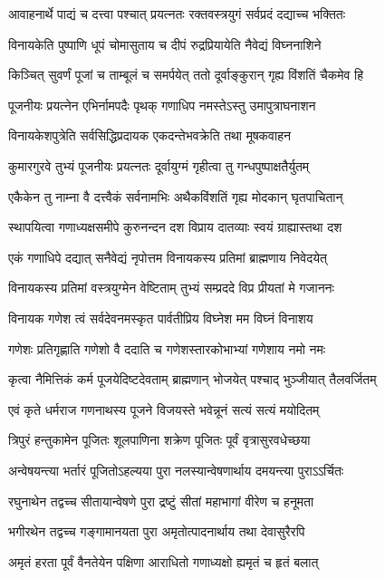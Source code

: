 \twolineshloka
{आवाहनार्थे पाद्यं च दत्त्वा पश्चात् प्रयत्नतः}
{रक्तवस्त्रयुगं सर्वप्रदं दद्याच्च भक्तितः}%

\twolineshloka
{विनायकेति पुष्पाणि धूपं चोमासुताय च}
{दीपं रुद्रप्रियायेति नैवेद्यं विघ्ननाशिने}%

\twolineshloka
{किञ्चित् सुवर्णं पूजां च ताम्बूलं च समर्पयेत्}
{ततो दूर्वाङ्कुरान् गृह्य विंशतिं चैकमेव हि}%

\twolineshloka
{पूजनीयः प्रयत्नेन एभिर्नामपदैः पृथक्}
{गणाधिप नमस्तेऽस्तु उमापुत्राघनाशन}%

\twolineshloka
{विनायकेशपुत्रेति सर्वसिद्धिप्रदायक}
{एकदन्तेभवक्रेति तथा मूषकवाहन}%

\twolineshloka
{कुमारगुरवे तुभ्यं पूजनीयः प्रयत्नतः}
{दूर्वायुग्मं गृहीत्वा तु गन्धपुष्पाक्षतैर्युतम्}%

\twolineshloka
{एकैकेन तु नाम्ना वै दत्त्वैकं सर्वनामभिः}
{अथैकविंशतिं गृह्य मोदकान् घृतपाचितान्}%

\twolineshloka
{स्थापयित्वा गणाध्यक्षसमीपे कुरुनन्दन}
{दश विप्राय दातव्याः स्वयं ग्राह्यास्तथा दश}%

\twolineshloka
{एकं गणाधिपे दद्यात् सनैवेद्यं नृपोत्तम}
{विनायकस्य प्रतिमां ब्राह्मणाय निवेदयेत्}%

\twolineshloka
{विनायकस्य प्रतिमां वस्त्रयुग्मेन वेष्टिताम्}
{तुभ्यं सम्प्रददे विप्र प्रीयतां मे गजाननः}%

\twolineshloka
{विनायक गणेश त्वं सर्वदेवनमस्कृत}
{पार्वतीप्रिय विघ्नेश मम विघ्नं विनाशय}%

\twolineshloka
{गणेशः प्रतिगृह्णाति गणेशो वै ददाति च}
{गणेशस्तारकोभाभ्यां गणेशाय नमो नमः}%

\twolineshloka
{कृत्वा नैमित्तिकं कर्म पूजयेदिष्टदेवताम्}
{ब्राह्मणान् भोजयेत् पश्चाद् भुञ्जीयात् तैलवर्जितम्}%

\twolineshloka
{एवं कृते धर्मराज गणनाथस्य पूजने}
{विजयस्ते भवेन्नूनं सत्यं सत्यं मयोदितम्}%

\twolineshloka
{त्रिपुरं हन्तुकामेन पूजितः शूलपाणिना}
{शक्रेण पूजितः पूर्वं वृत्रासुरवधेच्छया}%

\twolineshloka
{अन्वेषयन्त्या भर्तारं पूजितोऽहल्यया पुरा}
{नलस्यान्वेषणार्थाय दमयन्त्या पुराऽऽर्चितः}%

\twolineshloka
{रघुनाथेन तद्वच्च सीतायान्वेषणे पुरा}
{द्रष्टुं सीतां महाभागां वीरेण च हनूमता}%

\twolineshloka
{भगीरथेन तद्वच्च गङ्गामानयता पुरा}
{अमृतोत्पादनार्थाय तथा देवासुरैरपि}%

\twolineshloka
{अमृतं हरता पूर्वं वैनतेयेन पक्षिणा}
{आराधितो गणाध्यक्षो ह्यमृतं च हृतं बलात्}%

